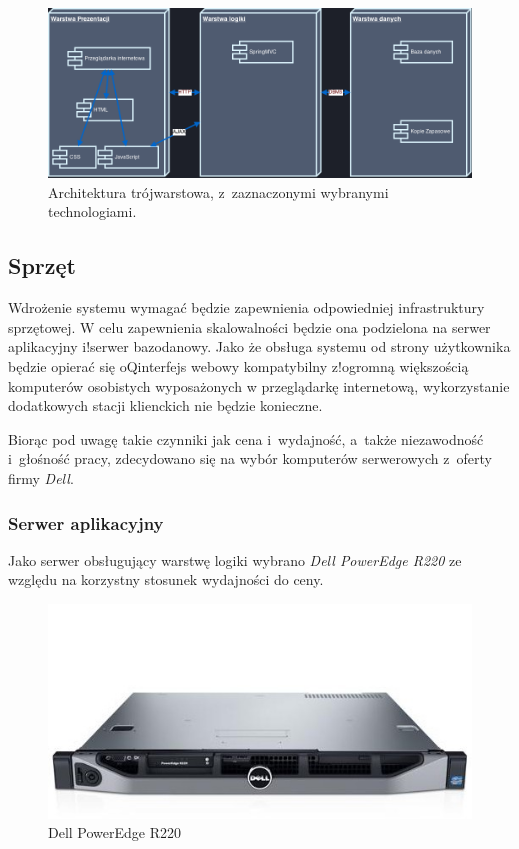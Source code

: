 \begin{figure}[H]
  \includegraphics[width=\textwidth]{images/3tier.png}
  \caption{Architektura trójwarstowa, z~zaznaczonymi wybranymi technologiami.}
\end{figure}

\subsection{Sprzęt}

Wdrożenie systemu wymagać będzie zapewnienia odpowiedniej infrastruktury sprzętowej. W celu zapewnienia skalowalności będzie ona podzielona na serwer aplikacyjny i!serwer bazodanowy. Jako że obsługa systemu od strony użytkownika będzie opierać się oQinterfejs webowy kompatybilny z!ogromną większością komputerów osobistych wyposażonych w przeglądarkę internetową, wykorzystanie dodatkowych stacji klienckich nie będzie konieczne.

Biorąc pod uwagę takie czynniki jak cena i~wydajność, a~także niezawodność i~głośność pracy, zdecydowano się na wybór komputerów serwerowych z~oferty firmy \textit{Dell}.

\subsubsection{Serwer aplikacyjny}

Jako serwer obsługujący warstwę logiki wybrano \textit{Dell PowerEdge R220} ze względu na korzystny stosunek wydajności do ceny.

\begin{figure}[H]
  \includegraphics[width=\textwidth]{images/poweredge-r220.jpg}
  \caption{Dell PowerEdge R220}
\end{figure}

